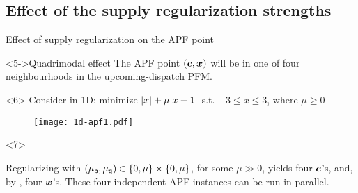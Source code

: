 \subsection{Effect of the supply regularization strengths}

\begin{frame}[t]{Effect of supply regularization on the APF point}{}

    \begin{block}<5->{Quadrimodal effect}
        The APF point \(\left(\boldsymbol{c},\boldsymbol{x}\right)\) will be {\color{CornellRed}in one of four neighbourhoods}
        in the upcoming-dispatch PFM.
    \end{block}

    \begin{overlayarea}{\textwidth}{\textheight}
    \begin{onlyenv}<6>
    Consider \XED in 1D:
    minimize \(\AbsVal*{x} + \mu\AbsVal*{x-1}\) s.t. \(-3 \leq x \leq 3\), where \(\mu \geq 0\)
    \begin{figure} \texttt{[image: 1d-apf1.pdf]} \end{figure}
    \end{onlyenv}

    \begin{onlyenv}<7>
    \begin{corollary}
        Regularizing \XED with
        {\color{CornellRed}
        \(\XEDRegs \in \left\{0,\mu\right\} \times \left\{0,\mu\right\}\),
        for some \(\mu \gg 0\)},
        yields four \(\boldsymbol{c}\)'s,
        and, by \APFE, four \(\boldsymbol{x}\)'s.
        These {\color{CornellRed}four independent APF instances} can be run in parallel.
    \end{corollary}
    \end{onlyenv}
    \end{overlayarea}
\end{frame}
